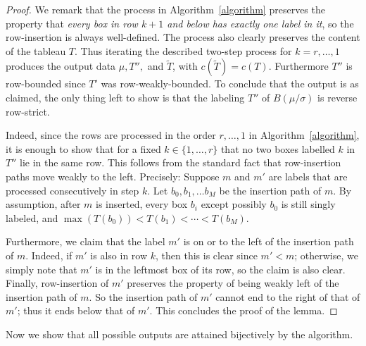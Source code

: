 \documentclass[11pt]{article}
\theoremstyle{definition}
\newcommand{\wt}{\widetilde}
\begin{document}
\begin{proof}
We remark that the process in Algorithm~\ref{algorithm} preserves the property that \emph{every box in row $k+1$ and below has exactly one label in it}, so the row-insertion is always well-defined. The process also clearly preserves the content of the tableau $T$. Thus iterating the described two-step process for $k=r,\ldots,1$ produces the output data $\mu, T'',$ and $\wt T$, with $c(\wt{T}) = c(T)$. Furthermore $T''$ is row-bounded since $T'$ was row-weakly-bounded. To conclude that the output is as claimed, the only thing left to show is that the labeling $T''$ of $B(\mu/\sigma)$ is reverse row-strict.

 Indeed, since the rows are processed in the order $r,\ldots,1$ in Algorithm~\ref{algorithm}, it is enough to show that for a fixed $k\in\{1,\ldots,r\}$ that no two boxes labelled $k$ in $T''$ lie in the same row. This follows from the standard fact that row-insertion paths move weakly to the left. Precisely: Suppose $m$ and $m'$ are labels that are processed consecutively in step $k$. Let $b_0,b_1,\ldots b_M$ be the insertion path of $m$. By assumption, after $m$ is inserted, every box $b_i$ except possibly $b_0$ is still singly labeled, and $\max(T(b_0)) < T(b_1) < \cdots < T(b_M)$. 

Furthermore, we claim that the label $m'$ is on or to the left of the insertion path of $m$. Indeed, if $m'$ is also in row $k$, then this is clear since $m'<m$; otherwise, we simply note that $m'$ is in the leftmost box of its row, so the claim is also clear. Finally, row-insertion of $m'$ preserves the property of being weakly left of the insertion path of $m$. So the insertion path of $m'$ cannot end to the right of that of $m'$; thus it ends below that of $m'$. This concludes the proof of the lemma.
\end{proof}

Now we show that all possible outputs are attained bijectively by the algorithm.
\end{document}
